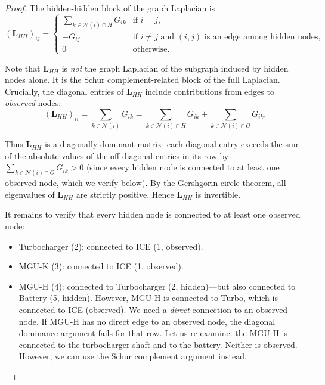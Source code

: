 \documentclass[twocolumn,10pt,a4paper]{article}
\theoremstyle{definition}
\theoremstyle{remark}
\newcommand{\mat}[1]{\mathbf{#1}}
\begin{document}
\begin{proof}
The hidden-hidden block of the graph Laplacian is
\begin{equation}
    (\mat{L}_{HH})_{ij} = \begin{cases}
        \sum_{k \in \mathcal{N}(i) \cap H} G_{ik} & \text{if } i = j, \\
        -G_{ij} & \text{if } i \neq j \text{ and } (i,j) \text{ is an edge among hidden nodes}, \\
        0 & \text{otherwise}.
    \end{cases}
\end{equation}

Note that $\mat{L}_{HH}$ is \emph{not} the graph Laplacian of the subgraph induced by hidden nodes alone. It is the Schur complement-related block of the full Laplacian. Crucially, the diagonal entries of $\mat{L}_{HH}$ include contributions from edges to \emph{observed} nodes:
\begin{equation}
    (\mat{L}_{HH})_{ii} = \sum_{k \in \mathcal{N}(i)} G_{ik} = \sum_{k \in \mathcal{N}(i) \cap H} G_{ik} + \sum_{k \in \mathcal{N}(i) \cap O} G_{ik}.
\end{equation}

Thus $\mat{L}_{HH}$ is a diagonally dominant matrix: each diagonal entry exceeds the sum of the absolute values of the off-diagonal entries in its row by $\sum_{k \in \mathcal{N}(i) \cap O} G_{ik} > 0$ (since every hidden node is connected to at least one observed node, which we verify below). By the Gershgorin circle theorem, all eigenvalues of $\mat{L}_{HH}$ are strictly positive. Hence $\mat{L}_{HH}$ is invertible.

It remains to verify that every hidden node is connected to at least one observed node:
\begin{itemize}
    \item Turbocharger (2): connected to ICE (1, observed).
    \item MGU-K (3): connected to ICE (1, observed).
    \item MGU-H (4): connected to Turbocharger (2, hidden)---but also connected to Battery (5, hidden). However, MGU-H is connected to Turbo, which is connected to ICE (observed). We need a \emph{direct} connection to an observed node. If MGU-H has no direct edge to an observed node, the diagonal dominance argument fails for that row. Let us re-examine: the MGU-H is connected to the turbocharger shaft and to the battery. Neither is observed. However, we can use the Schur complement argument instead.


\end{itemize}
\end{proof}
\end{document}
